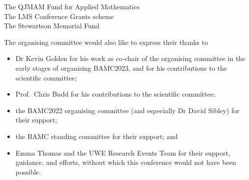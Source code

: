 \documentclass[12pt,a4paper]{article}
\begin{document}
{\centering
{\large The QJMAM Fund for Applied Mathematics} \\[18pt]
{\large The LMS Conference Grants scheme} \\[18pt] 
{\large The Stewartson Memorial Fund}

}

\vspace{18pt}
The organising committee would also like to express their thanks to
\begin{itemize}
    \item  Dr Kevin Golden for his work as co-chair of the organising committee in the early stages of organising BAMC2023, and for his contributions to the scientific committee; 
    \item Prof.\ Chris Budd for his contributions to the scientific committee;
    \item the BAMC2022 organising committee (and especially Dr David Sibley) for their support;
    \item the BAMC standing committee for their support; and
    \item Emma Thomas and the UWE Research Events Team for their support, guidance, and efforts, without which this conference would not have been possible.
\end{itemize}





\end{document}

